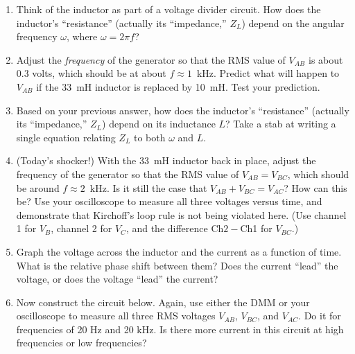 \begin{enumerate}[wide]
\item Think of the inductor as part of a voltage divider circuit.  How does the inductor's ``resistance'' (actually its ``impedance,'' $Z_L$) depend on the angular frequency $\omega$, where $\omega = 2 \pi f$?

\item Adjust the \textit{frequency} of the generator so that the RMS value of $V_{AB}$ is about 0.3 volts, which should be at about $f \approx 1$~kHz.  Predict what will happen to $V_{AB}$ if the 33~mH inductor is replaced by 10~mH.  Test your prediction.

\item Based on your previous answer, how does the inductor's ``resistance'' (actually its ``impedance,''  $Z_L$) depend on its inductance $L$?  Take a stab at writing a single equation relating $Z_L$ to both $\omega$ and $L$.

\item (Today's shocker!) With the 33~mH inductor back in place, adjust the frequency of the generator so that the RMS value of $V_{AB} = V_{BC}$, which should be around $f \approx 2$~kHz.   Is it still the case that $V_{AB} + V_{BC} = V_{AC}$?  How can this be?  Use your oscilloscope to measure all three voltages versus time, and demonstrate that Kirchoff's loop rule is not being violated here.  (Use channel 1 for $V_B$, channel 2 for $V_C$, and the difference Ch$2- $Ch1 for $V_{BC}$.)

\item Graph the voltage across the inductor and the current as a function of time.  What is the relative phase shift between them?  Does the current ``lead'' the voltage, or does the voltage ``lead'' the current? \label{part_RL_graphs}

\newpage

\item Now construct the circuit below. Again, use either the DMM or your oscilloscope to measure all three RMS voltages  $V_{AB}$,  $V_{BC}$, and $V_{AC}$.   Do it for frequencies of 20 Hz and 20 kHz.  Is there more current in this circuit at high frequencies or low frequencies?


\end{enumerate}
